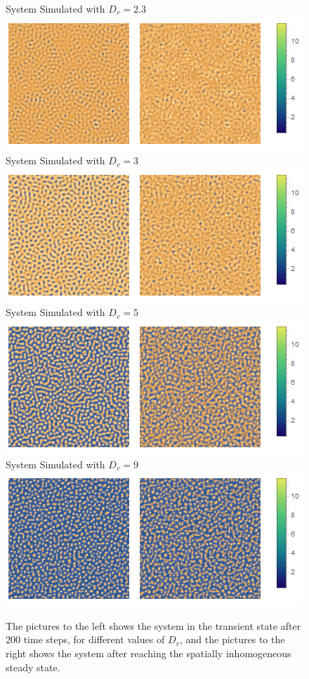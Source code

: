\begin{figure}[h]
\centering
System Simulated with $D_v=2.3$\\
\includegraphics[scale=0.5]{img/2bd23Comb.png}\\
System Simulated with $D_v=3$\\
\includegraphics[scale=0.5]{img/2bd3Comb.png}\\
System Simulated with $D_v=5$\\
\includegraphics[scale=0.5]{img/2bd5Comb.png}\\
System Simulated with $D_v=9$\\
\includegraphics[scale=0.5]{img/2bd9Comb.png}\\
\caption{\label{fig:pic2b} The pictures to the left shows the system in the transient state after 200 time steps, for different values of $D_v$, and the pictures to the right shows the system after reaching the spatially inhomogeneous steady state.}
\end{figure}
